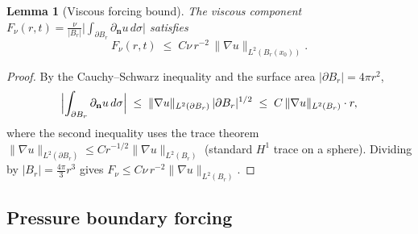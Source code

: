 \documentclass[11pt]{article}
\newtheorem{lemma}[theorem]{Lemma}
\theoremstyle{definition}
\theoremstyle{remark}
\begin{document}
\begin{lemma}[Viscous forcing bound]\label{lem:viscous-forcing}
  The viscous component
  $F_\nu(r,t) = \tfrac{\nu}{|B_r|}\bigl|\int_{\partial B_r}\partial_{\mathbf{n}} u\,d\sigma\bigr|$
  satisfies
  \begin{equation}\label{eq:viscous-forcing}
    F_\nu(r,t) \;\leq\; C\nu\,r^{-2}\,\|\nabla u\|_{L^{2}(B_r(x_0))}.
  \end{equation}
\end{lemma}
\begin{proof}
By the Cauchy--Schwarz inequality and the surface area $|\partial B_r| = 4\pi r^2$,
\[
  \Bigl|\int_{\partial B_r}\partial_{\mathbf{n}} u\,d\sigma\Bigr|
  \;\leq\; \|\nabla u\|_{L^{2}(\partial B_r)}\,|\partial B_r|^{1/2}
  \;\leq\; C\,\|\nabla u\|_{L^{2}(B_r)}\cdot r,
\]
where the second inequality uses the trace theorem
$\|\nabla u\|_{L^{2}(\partial B_r)} \leq C r^{-1/2}\|\nabla u\|_{L^{2}(B_r)}$
(standard $H^1$ trace on a sphere).  Dividing by $|B_r| = \tfrac{4\pi}{3}r^3$
gives $F_\nu \leq C\nu\,r^{-2}\|\nabla u\|_{L^{2}(B_r)}$.
\end{proof}

\subsection{Pressure boundary forcing}
\end{document}
